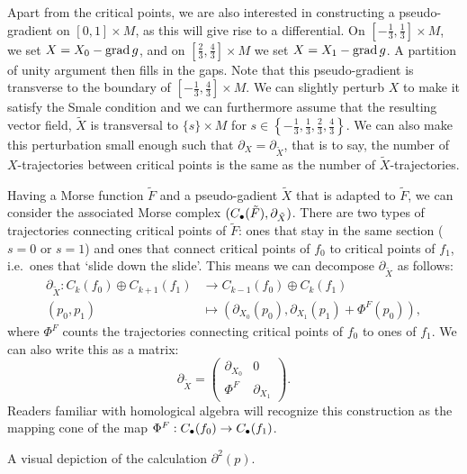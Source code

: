 \begin{myproof}
Apart from the critical points, we are also interested in constructing a pseudo-gradient on $[0,1]\times M$, as this will give rise to a differential.
 On $[-\frac{1}{3}, \frac{1}{3}] \times M$, we set $X = X_0 - \operatorname{grad} g$, and on $\left[\frac{2}{3}, \frac{4}{3}\right] \times M$ we set $X = X_1 - \operatorname{grad} g$.
A partition of unity argument then fills in the gaps.
Note that this pseudo-gradient is transverse to the boundary of $\left[-\frac{1}{3}, \frac{4}{3}\right] \times M$.
We can slightly perturb $X$ to make it satisfy the Smale condition and we can furthermore assume that the resulting vector field, $\tilde{X}$ is transversal to $ \{s\} \times M$ for $s \in \left\{-\frac{1}{3}, \frac{1}{3}, \frac{2}{3}, \frac{4}{3}\right\}$.
We can also make this perturbation small enough such that $\partial_{X} = \partial_{\tilde{X}}$, that is to say, the number of $X$-trajectories between critical points is the same as the number of $\tilde{X}$-trajectories.

Having a Morse function $\tilde{F}$ and a pseudo-gadient $\tilde{X}$ that is adapted to $\tilde{F}$, we can consider the associated Morse complex $(C_\bullet(\tilde{F}), \partial_{\tilde{X}})$.
There are two types of trajectories connecting critical points of $\tilde{F}$: ones that stay in the same section ($s = 0$ or $s = 1$)  and ones that connect critical points of $f_0$ to critical points of $f_1$, i.e.\ ones that `slide down the slide'.
This means we can decompose $\partial_{\tilde{X}}$ as follows:
\begin{align*}
    \partial_{\tilde{X}}: C_k(f_0) \oplus C_{k+1}(f_1) &\longrightarrow C_{k-1}(f_0) \oplus C_k(f_1) \\
    (p_0, p_1) &\longmapsto (\partial_{X_0}(p_0), \partial_{X_1}(p_1)+ \Phi^{F}(p_0))
,\end{align*}
where $\Phi^{F}$ counts the trajectories connecting critical points of $f_0$ to ones of $f_1$. We can also write this as a matrix:
\[
\partial_{\tilde{X}} = \begin{pmatrix}
    \partial_{X_0} & 0 \\
     \Phi^{F}& \partial_{X_1}
\end{pmatrix}
.\] 
Readers familiar with homological algebra will recognize this construction as the mapping cone of the map $\Phi^{F}: C_\bullet(f_0) \to  C_\bullet(f_1)$.

\begin{marginfigure}
    \centering
    \caption{A visual depiction of the calculation $\partial^2(p)$.}
    \label{fig:morse-homology-independence-partial-squared-zero}
\end{marginfigure}


\end{myproof}
